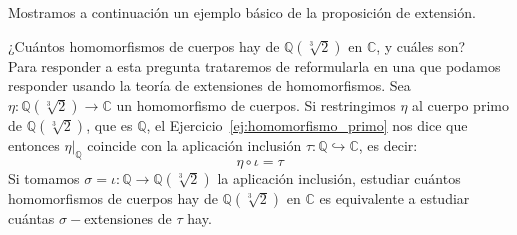 \noindent
Mostramos a continuación un ejemplo básico de la proposición de extensión.

\begin{ejemplo}
    ¿Cuántos homomorfismos de cuerpos hay de $\mathbb{Q}\left(\sqrt[3]{2}\right)$ en $\mathbb{C}$, y cuáles son?\\

    \noindent
    Para responder a esta pregunta trataremos de reformularla en una que podamos responder usando la teoría de extensiones de homomorfismos. Sea $\eta:\mathbb{Q}\left(\sqrt[3]{2}\right)\to\mathbb{C}$ un homomorfismo de cuerpos. Si restringimos $\eta$ al cuerpo primo de $\mathbb{Q}\left(\sqrt[3]{2}\right)$, que es $\mathbb{Q}$, el Ejercicio~\ref{ej:homomorfismo_primo} nos dice que entonces $\eta\big|_{\mathbb{Q}}$ coincide con la aplicación inclusión $\tau:\mathbb{Q}\hookrightarrow \mathbb{C}$, es decir:
    \begin{equation*}
        \eta  \circ \iota = \tau
    \end{equation*}
    Si tomamos $\sigma=\iota:\mathbb{Q}\to\mathbb{Q}\left(\sqrt[3]{2}\right)$ la aplicación inclusión, estudiar cuántos homomorfismos de cuerpos hay de $\mathbb{Q}\left(\sqrt[3]{2}\right)$ en $\mathbb{C}$ es equivalente a estudiar cuántas $\sigma-$extensiones de $\tau$ hay.
    \begin{figure}[H]
        \centering
    \end{figure}
    

\end{ejemplo}
